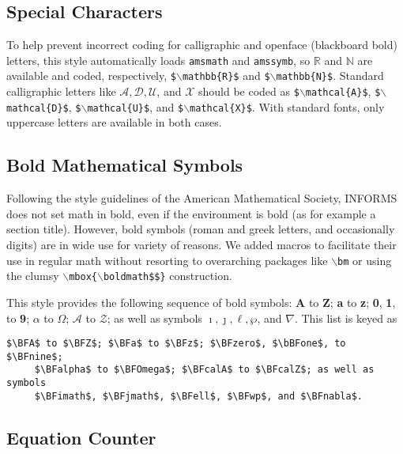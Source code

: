 \documentclass[ijds,nonblindrev]{informs4}
\begin{document}
\subsection{Special Characters}\label{sec5.1}

To help prevent incorrect coding for calligraphic and openface (blackboard 
bold) letters, this style automatically loads \texttt{amsmath} and
\texttt{amssymb}, so $\mathbb{R}$ and $\mathbb{N}$ are available and coded, respectively,
\texttt{\$$\backslash $mathbb\{R\}\$} and 
\texttt{\$$\backslash $mathbb\{N\}\$}. Standard calligraphic letters
like $\mathcal{A}, \mathcal{D}, \mathcal{U}$, and $\mathcal{X}$ 
should be coded as \texttt{\$$\backslash $mathcal\{A\}\$}, 
\texttt{\$$\backslash $mathcal\{D\}\$}, 
\texttt{\$$\backslash $mathcal\{U\}\$}, and 
\texttt{\$$\backslash $mathcal\{X\}\$}. With standard fonts, only uppercase letters are 
available in both cases.

\subsection{Bold Mathematical Symbols}\label{sec5.2}

Following the style guidelines of the American Mathematical Society, INFORMS 
does not set math in bold, even if the environment is bold (as for example a 
section title). However, bold symbols (roman and greek letters, and 
occasionally digits) are in wide use for variety of reasons. We added macros 
to facilitate their use in regular math without resorting to overarching 
packages like \texttt{$\backslash $bm} or using the clumsy
\texttt{$\backslash $mbox\{$\backslash $boldmath\$\$\}} construction. 

This style provides the following sequence of bold symbols: {\bf A}
to {\bf Z}; {\bf a} to {\bf z}; {\bf 0}, {\bf 1}, to {\bf 9};
\mbox{\boldmath$\alpha$} to \mbox{\boldmath$\Omega$}; \mbox{\boldmath$\mathcal{A}$} to
\mbox{\boldmath$\mathcal{Z}$}; as well as symbols \mbox{\boldmath$\imath, \jmath, \ell,
\wp$}, and \mbox{\boldmath$\nabla$}. This list is keyed as 

\begin{Verbatim}[fontsize=\small]
     $\BFA$ to $\BFZ$; $\BFa$ to $\BFz$; $\BFzero$, $\bBFone$, to $\BFnine$; 
     $\BFalpha$ to $\BFOmega$; $\BFcalA$ to $\BFcalZ$; as well as symbols 
     $\BFimath$, $\BFjmath$, $\BFell$, $\BFwp$, and $\BFnabla$.
\end{Verbatim}

\subsection{Equation Counter}\label{sec5.3}
\end{document}
